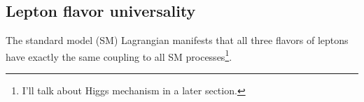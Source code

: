 
\subsection{Lepton flavor universality}
The standard model (SM) Lagrangian manifests that all three flavors of leptons
have exactly the same coupling to all SM processes\footnote{
    I'll talk about Higgs mechanism in a later section.
}.
